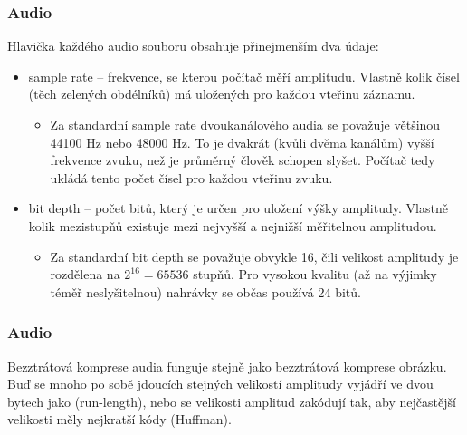 \documentclass[aspectratio=169,11pt,svgnames]{beamer}
\begin{document}
\begin{frame}
 \frametitle{Audio}
 Hlavička každého audio souboru obsahuje přinejmenším dva údaje:
 \pause
 \begin{itemize}[label=\textbullet]
  \item \alert{sample rate} -- frekvence, se kterou počítač měří amplitudu.
   Vlastně kolik čísel (těch zelených obdélníků) má uložených pro každou vteřinu
   záznamu.
  \pause
  \begin{itemize}[label=\textemdash]
   \item Za standardní sample rate dvoukanálového audia se považuje většinou
    44100 Hz nebo 48000 Hz. To je dvakrát (kvůli dvěma kanálům) vyšší frekvence
    zvuku, než je průměrný člověk schopen slyšet. Počítač tedy ukládá tento
    počet čísel pro každou vteřinu zvuku.
  \end{itemize}
 \pause
 \item \alert{bit depth} -- počet bitů, který je určen pro uložení výšky
  amplitudy. Vlastně kolik mezistupňů existuje mezi nejvyšší a nejnižší
  měřitelnou amplitudou.
  \pause
  \begin{itemize}[label=\textbullet]
   \item Za standardní bit depth se považuje obvykle 16, čili velikost amplitudy
    je rozdělena na $2^{16} = 65536$ stupňů. Pro vysokou kvalitu (až na výjimky
    téměř neslyšitelnou) nahrávky se občas používá 24 bitů.
  \end{itemize}
 \end{itemize}
\end{frame}

\begin{frame}
 \frametitle{Audio}
 Bezztrátová komprese audia funguje stejně jako bezztrátová komprese
 obrázku.\pause\\
 Buď se mnoho po sobě jdoucích stejných velikostí amplitudy vyjádří ve dvou
 bytech jako  (run-length), \pause
 nebo se velikosti amplitud zakódují tak, aby nejčastější velikosti měly
 nejkratší kódy (Huffman).
\end{frame}
\end{document}
